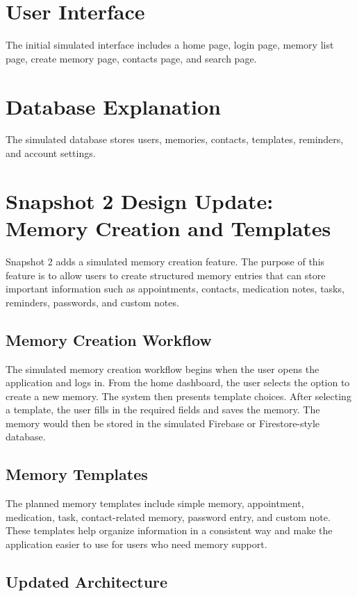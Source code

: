\documentclass{article}
\begin{document}
\section{User Interface}
The initial simulated interface includes a home page, login page, memory list page, create memory page, contacts page, and search page.

\section{Database Explanation}
The simulated database stores users, memories, contacts, templates, reminders, and account settings.

\section{Snapshot 2 Design Update: Memory Creation and Templates}

Snapshot 2 adds a simulated memory creation feature. The purpose of this feature is to allow users to create structured memory entries that can store important information such as appointments, contacts, medication notes, tasks, reminders, passwords, and custom notes.

\subsection{Memory Creation Workflow}

The simulated memory creation workflow begins when the user opens the application and logs in. From the home dashboard, the user selects the option to create a new memory. The system then presents template choices. After selecting a template, the user fills in the required fields and saves the memory. The memory would then be stored in the simulated Firebase or Firestore-style database.

\subsection{Memory Templates}

The planned memory templates include simple memory, appointment, medication, task, contact-related memory, password entry, and custom note. These templates help organize information in a consistent way and make the application easier to use for users who need memory support.

\subsection{Updated Architecture}
\end{document}
